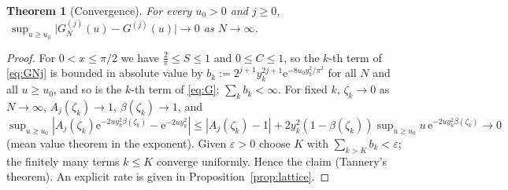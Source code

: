 \documentclass[11pt,a4paper]{article}
\newtheorem{theorem}{Theorem}[section]
\theoremstyle{definition}
\theoremstyle{remark}
\newcommand{\ee}{\mathrm{e}}
\begin{document}
\begin{theorem}[Convergence]\label{thm:conv}
For every $u_0>0$ and $j\ge0$, $\ \sup_{u\ge u_0}\bigl|G_N^{(j)}(u)-G^{(j)}(u)\bigr|\to0$ as $N\to\infty$.
\end{theorem}
\begin{proof}
For $0<x\le\pi/2$ we have $\frac2\pi\le S\le1$ and $0\le C\le1$, so the $k$-th term of \eqref{eq:GNj} is bounded in
absolute value by $b_k:=2^{j+1}y_k^{2j+1}\ee^{-8u_0y_k^2/\pi^2}$ for all $N$ and all $u\ge u_0$, and so is the
$k$-th term of \eqref{eq:G}; $\sum_kb_k<\infty$. For fixed $k$, $\zeta_k\to0$ as $N\to\infty$, $A_j(\zeta_k)\to1$,
$\beta(\zeta_k)\to1$, and
$\sup_{u\ge u_0}|A_j(\zeta_k)\ee^{-2uy_k^2\beta(\zeta_k)}-\ee^{-2uy_k^2}|\le|A_j(\zeta_k)-1|+2y_k^2(1-\beta(\zeta_k))
\sup_{u\ge u_0}u\,\ee^{-2uy_k^2\beta(\zeta_k)}\to0$ (mean value theorem in the exponent). Given $\varepsilon>0$ choose
$K$ with $\sum_{k>K}b_k<\varepsilon$; the finitely many terms $k\le K$ converge uniformly. Hence the claim
(Tannery's theorem). An explicit rate is given in Proposition~\ref{prop:lattice}.
\end{proof}
\end{document}
